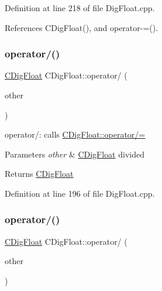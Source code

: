 Definition at line 218 of file Dig\+Float.\+cpp.



References C\+Dig\+Float(), and operator-\/=().

\mbox{\label{classCDigFloat_a238db4ab96c398e3d2387641743d6a16}} 
\subsubsection{\texorpdfstring{operator/()}{operator/()}\hspace{0.1cm}{\footnotesize\ttfamily [1/2]}}
{\footnotesize\ttfamily \hyperlink{classCDigFloat}{C\+Dig\+Float} C\+Dig\+Float\+::operator/ (\begin{DoxyParamCaption}\item[{const \hyperlink{classCDigFloat}{C\+Dig\+Float} \&}]{other }\end{DoxyParamCaption})}



operator/\+: calls \hyperlink{classCDigFloat_a53d3939dfc89d172f1bf803a46bc3369}{C\+Dig\+Float\+::operator/=} 


\begin{DoxyParams}{Parameters}
{\em other} & \hyperlink{classCDigFloat}{C\+Dig\+Float} divided \\
\hline
\end{DoxyParams}
\begin{DoxyReturn}{Returns}
\hyperlink{classCDigFloat}{C\+Dig\+Float} 
\end{DoxyReturn}


Definition at line 196 of file Dig\+Float.\+cpp.

\mbox{\label{classCDigFloat_a4e9cc3b14f2b5a6d704957fb1a8de1a2}} 
\subsubsection{\texorpdfstring{operator/()}{operator/()}\hspace{0.1cm}{\footnotesize\ttfamily [2/2]}}
{\footnotesize\ttfamily \hyperlink{classCDigFloat}{C\+Dig\+Float} C\+Dig\+Float\+::operator/ (\begin{DoxyParamCaption}\item[{const double}]{other }\end{DoxyParamCaption})}



